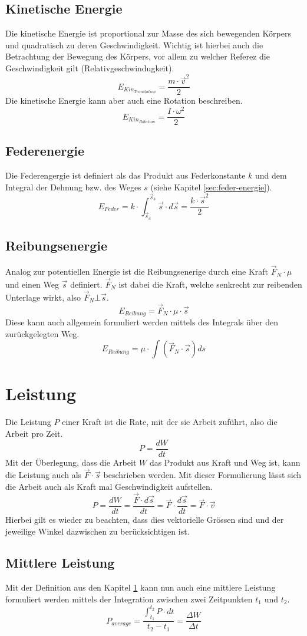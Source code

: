 \subsection{Kinetische Energie}
Die kinetische Energie ist proportional zur Masse des sich bewegenden Körpers
und quadratisch zu deren Geschwindigkeit. Wichtig ist hierbei auch die 
Betrachtung der Bewegung des Körpers, vor allem zu welcher Referez die 
Geschwindigkeit gilt (Relativgeschwindugkeit).
\[ \boxed{ E_{Kin_{Translation}} = \frac{m \cdot \vec{v}^2}{2} } \]
Die kinetische Energie kann aber auch eine Rotation beschreiben.
\[ \boxed{ E_{Kin_{Rotation}} = \frac{I \cdot \omega^2}{2} } \]

\subsection{Federenergie}
Die Federengergie ist definiert als das Produkt aus Federkonstante $k$ und 
dem Integral der Dehnung bzw. des Weges $s$ 
(siehe Kapitel \ref{sec:feder-energie}).
\[ \boxed{E_{Feder} 
	= k \cdot \int_{\vec{s}_a}^{\vec{s}_b} \vec{s} \cdot d\vec{s} 
	= \frac{k \cdot \vec{s}^2}{2}} \]

\subsection{Reibungsenergie}
Analog zur potentiellen Energie ist die Reibungsenerige durch eine Kraft
$\vec{F}_N \cdot \mu$ und einen Weg $\vec{s}$ definiert. 
$\vec{F}_N$ ist dabei die Kraft, welche senkrecht zur reibenden Unterlage 
wirkt, also $\vec{F}_N \bot \vec{s}$.
\[ \boxed{E_{Reibung} = \vec{F}_N \cdot \mu \cdot \vec{s}} \]
Diese kann auch allgemein formuliert werden mittels des Integrals über
den zurückgelegten Weg.
\[ \boxed{
	E_{Reibung} = \mu \cdot \int \left( 
		\vec{F}_N \cdot \vec{s} \right) ds} 
\]

\section{Leistung}\label{sec:leistung}
Die Leistung $P$ einer Kraft ist die Rate, mit der sie Arbeit zuführt,
also die Arbeit pro Zeit.
\[ \boxed{P = \frac{dW}{dt} } \]
Mit der Überlegung, dass die Arbeit $W$ das Produkt aus Kraft und Weg
ist, kann die Leistung auch als $\vec{F} \cdot \vec{s}$ beschrieben
werden. Mit dieser Formulierung lässt sich die Arbeit auch als Kraft mal
Geschwindigkeit aufstellen.
\[ \boxed{
	P 
		= \frac{dW}{dt} 
		= \frac{\vec{F} \cdot d\vec{s}}{dt}
		= \vec{F} \cdot \frac{d\vec{s}}{dt} 
		= \vec{F} \cdot \vec{v}
} \]
Hierbei gilt es wieder zu beachten, dass dies vektorielle Grössen sind
und der jeweilige Winkel dazwischen zu berücksichtigen ist.

\subsection{Mittlere Leistung}
Mit der Definition aus den Kapitel \ref{sec:leistung} kann nun auch eine
mittlere Leistung formuliert werden mittels der Integration zwischen
zwei Zeitpunkten $t_1$ und $t_2$.
\[ \boxed{
	P_{average} 
		= \frac{\displaystyle\int_{t_1}^{t_2} P\cdot dt}
			{t_2 - t_1}
		= \frac{\Delta W}{\Delta t} 
} \]
